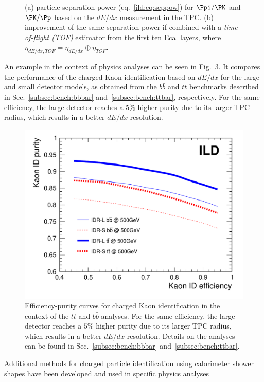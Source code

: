 \begin{figure}[htbp]
\begin{subfigure}{0.49\hsize}
 \caption{  \label{fig:perf:dedxtof_sep}}
 \end{subfigure}
\caption{ (a) particle separation power (eq.~\ref{ild:eq:seppow}) for $\Ppi/\PK$ and $\PK/\Pp$ based on the $dE/dx$ measurement in the TPC.
  (b) improvement of the same separation power if combined with a {\em time-of-flight (TOF)} estimator from the first ten Ecal layers,
  where $\eta_{dE/dx,TOF}=\eta_{dE/dx} \oplus \eta_{TOF}$.
}
\label{fig:perf:dedxtof}
\end{figure}

An example in the context of physics analyses can be seen in Fig.~\ref{fig:perf:KaonID}. It compares the performance of the charged Kaon identification based on $dE/dx$ for the large and small detector models, as obtained from the $b\bar{b}$ and $t\bar{t}$ benchmarks described in Sec.~\ref{subsec:bench:bbbar} and~\ref{subsec:bench:ttbar}, respectively. For the same efficiency, the large detector reaches a $5\%$ higher purity due to its larger TPC radius, which results in a better $dE/dx$ resolution.
\begin{figure}[b!]
  \includegraphics[width=0.8\hsize]{Performance/fig/kaonIDeff_v2-eps-converted-to.pdf}
  \caption{\label{fig:perf:KaonID}
    Efficiency-purity curves for charged Kaon identification in the context of the $t\bar{t}$ and $b\bar{b}$ analyses. For the same
    efficiency, the large detector reaches a $5\%$ higher purity due to its larger TPC radius, which results in a better $dE/dx$
    resolution. Details on the analyses can be found in Sec.~\ref{subsec:bench:bbbar} and~\ref{subsec:bench:ttbar}.
  }
\end{figure}
Additional methods for charged particle identification using calorimeter shower shapes have been developed and used in specific physics analyses~
